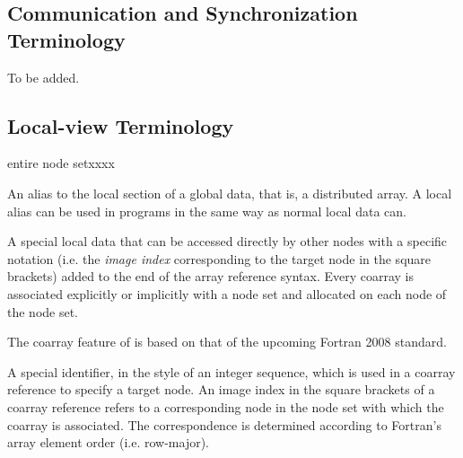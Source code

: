 \subsection{Communication and Synchronization Terminology}

To be added.

\subsection{Local-view Terminology}

\begin{namelist}{entire node setxxxx}


 An alias to the local section of a global data, that is, a distributed
 array. A local alias can be used in {\XMP} programs in the same way as
 normal local data can.


 A special local data that can be accessed directly by other nodes with
 a specific notation (i.e. the {\it image index} corresponding to the
 target node in the square brackets) added to the end of the array
 reference syntax.
%
 Every coarray is associated explicitly or implicitly with a node
 set and allocated on each node of the node set.

 The coarray feature of {\XMP} is based on that of the upcoming Fortran
 2008 standard.



 A special identifier, in the style of an integer sequence, which is
 used in a coarray reference to specify a target node. An image index in
 the square brackets of a coarray reference refers to a corresponding
 node in the node set with which the coarray is associated. The
 correspondence is determined according to Fortran's array element order
 (i.e. row-major).


\end{namelist}
